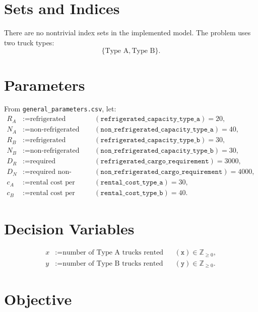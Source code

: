 \section*{Sets and Indices}

There are no nontrivial index sets in the implemented model. The problem uses two truck types:
\[
\{\text{Type A}, \text{Type B}\}.
\]

\section*{Parameters}

From \texttt{general\_parameters.csv}, let:
\begin{align*}
R_A &:= \text{refrigerated capacity of a Type A truck} 
&& (\texttt{refrigerated\_capacity\_type\_a}) = 20,\\
N_A &:= \text{non-refrigerated capacity of a Type A truck} 
&& (\texttt{non\_refrigerated\_capacity\_type\_a}) = 40,\\
R_B &:= \text{refrigerated capacity of a Type B truck} 
&& (\texttt{refrigerated\_capacity\_type\_b}) = 30,\\
N_B &:= \text{non-refrigerated capacity of a Type B truck} 
&& (\texttt{non\_refrigerated\_capacity\_type\_b}) = 30,\\
D_R &:= \text{required refrigerated cargo volume} 
&& (\texttt{refrigerated\_cargo\_requirement}) = 3000,\\
D_N &:= \text{required non-refrigerated cargo volume} 
&& (\texttt{non\_refrigerated\_cargo\_requirement}) = 4000,\\
c_A &:= \text{rental cost per Type A truck per kilometer} 
&& (\texttt{rental\_cost\_type\_a}) = 30,\\
c_B &:= \text{rental cost per Type B truck per kilometer} 
&& (\texttt{rental\_cost\_type\_b}) = 40.
\end{align*}

\section*{Decision Variables}

\begin{align*}
x &:= \text{number of Type A trucks rented} && (\texttt{x}) \in \mathbb{Z}_{\ge 0},\\
y &:= \text{number of Type B trucks rented} && (\texttt{y}) \in \mathbb{Z}_{\ge 0}.
\end{align*}

\section*{Objective}

